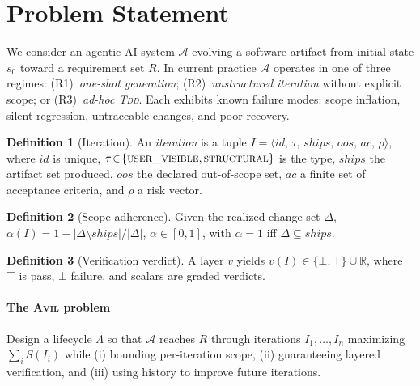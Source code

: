 \documentclass[10pt,twocolumn,letterpaper]{article}
\theoremstyle{definition}
\newtheorem{definition}{Definition}[section]
\theoremstyle{plain}
\newcommand{\AVIL}{\textsc{Avil}}
\newcommand{\TDD}{\textsc{Tdd}}
\newcommand{\R}{\mathbb{R}}
\begin{document}
\section{Problem Statement}\label{sec:problem}

We consider an agentic AI system $\mathcal{A}$ evolving a software
artifact from initial state $s_0$ toward a requirement set $R$. In
current practice $\mathcal{A}$ operates in one of three regimes:
(R1)~\emph{one-shot generation};
(R2)~\emph{unstructured iteration} without explicit scope; or
(R3)~\emph{ad-hoc \TDD{}}. Each exhibits known failure modes: scope
inflation, silent regression, untraceable changes, and poor recovery.

\begin{definition}[Iteration]\label{def:iteration}
An \emph{iteration} is a tuple
$I = \langle \mathit{id},\,\tau,\,\mathit{ships},\,\mathit{oos},\,
\mathit{ac},\,\rho \rangle$, where $\mathit{id}$ is unique,
$\tau\!\in\!\{\textsc{user\_visible}, \textsc{structural}\}$ is the type,
$\mathit{ships}$ the artifact set produced,
$\mathit{oos}$ the declared out-of-scope set,
$\mathit{ac}$ a finite set of acceptance criteria, and
$\rho$ a risk vector.
\end{definition}

\begin{definition}[Scope adherence]\label{def:scope}
Given the realized change set $\Delta$,
$\alpha(I)=1-|\Delta\setminus\mathit{ships}|/|\Delta|$,
$\alpha\!\in\![0,1]$, with $\alpha=1$ iff $\Delta\subseteq\mathit{ships}$.
\end{definition}

\begin{definition}[Verification verdict]\label{def:verdict}
A layer $v$ yields $v(I)\in\{\bot,\top\}\cup\R$, where $\top$ is
pass, $\bot$ failure, and scalars are graded verdicts.
\end{definition}

\paragraph{The \AVIL{} problem}
Design a lifecycle $\Lambda$ so that $\mathcal{A}$ reaches $R$
through iterations $I_1,\dots,I_n$ maximizing $\sum_i S(I_i)$
while (i) bounding per-iteration scope, (ii) guaranteeing layered
verification, and (iii) using history to improve future iterations.

\end{document}
